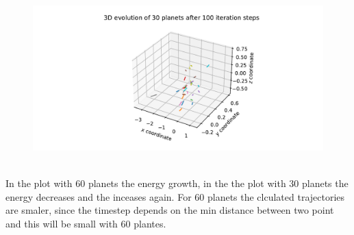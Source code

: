         \begin{figure}[h!]
            \centering
            \includegraphics[width=\textwidth]{./figures/task2_30body_3D_new_d.pdf}
        \end{figure} \ \\ 
In the plot with 60 planets the energy growth, in the the plot with 30 planets the energy decreases and the inceases again. For 60 planets the clculated trajectories are smaler, since the timestep depends on the min distance between two point and this will be small with 60 plantes. 